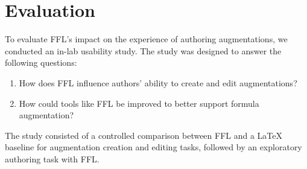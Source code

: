 \section{Evaluation}



To evaluate FFL's impact on the experience of authoring augmentations, we conducted an in-lab usability study. The study was designed to answer the following questions:

\begin{enumerate}
\item How does FFL influence authors' ability to create and edit augmentations?
\item How could tools like FFL be improved to better support formula augmentation?
\end{enumerate}

The study consisted of a controlled comparison between FFL and a LaTeX baseline for augmentation creation and editing tasks, followed by an exploratory authoring task with FFL.




